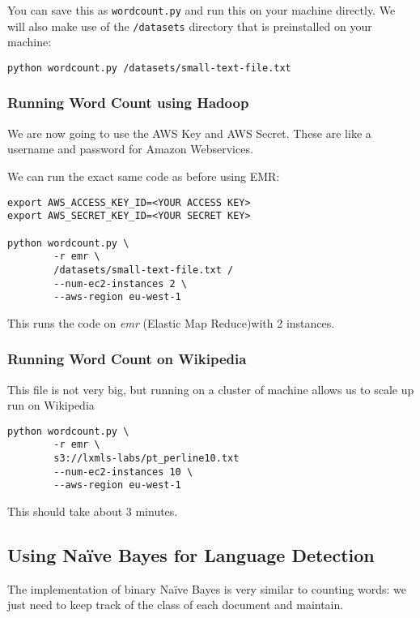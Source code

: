 You can save this as \texttt{wordcount.py} and run this on your machine
directly. We will also make use of the \texttt{/datasets} directory that is
preinstalled on your machine:

\begin{verbatim}
python wordcount.py /datasets/small-text-file.txt
\end{verbatim}

\subsubsection{Running Word Count using Hadoop}

We are now going to use the AWS Key and AWS Secret. These are like a username
and password for Amazon Webservices.

We can run the exact same code as before using EMR:

\begin{verbatim}
export AWS_ACCESS_KEY_ID=<YOUR ACCESS KEY>
export AWS_SECRET_KEY_ID=<YOUR SECRET KEY>

python wordcount.py \
        -r emr \
        /datasets/small-text-file.txt /
        --num-ec2-instances 2 \
        --aws-region eu-west-1
\end{verbatim}

This runs the code on \emph{emr} (Elastic Map Reduce)with 2 instances.

\subsubsection{Running Word Count on Wikipedia}

This file is not very big, but running on a cluster of machine allows us to
scale up run on Wikipedia

\begin{verbatim}
python wordcount.py \
        -r emr \
        s3://lxmls-labs/pt_perline10.txt
        --num-ec2-instances 10 \
        --aws-region eu-west-1
\end{verbatim}

This should take about 3 minutes.

\subsection{Using Naïve Bayes for Language Detection}

The implementation of binary Naïve Bayes is very similar to counting words: we just
need to keep track of the class of each document and maintain.

